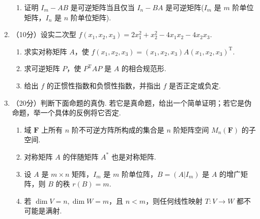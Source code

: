 \begin{enumerate}
\begin{enumerate}
        \item 证明 $I_m-AB$ 是可逆矩阵当且仅当 $I_n-BA$ 是可逆矩阵($I_m$ 是 $m$ 阶单位矩阵，$I_n$ 是 $n$ 阶单位矩阵).
    \end{enumerate}

    \item （10分）设实二次型 $f(x_1,x_2,x_3) = 2x_1^2+x_2^2-4x_1x_2-4x_2x_3$.
    \begin{enumerate}
        \item 求实对称矩阵 $A$，使 $f(x_1,x_2,x_3)=(x_1,x_2,x_3)A(x_1,x_2,x_3)^{\mathrm{T}}$.

        \item 求可逆矩阵 $P$，使 $P^\mathrm{T}AP$ 是 $A$ 的相合规范形.

        \item 给出 $f$ 的正惯性指数和负惯性指数，并指出 $f$ 是否正定或负定.
    \end{enumerate}

    \item （20分）判断下面命题的真伪. 若它是真命题，给出一个简单证明；若它是伪命题，举一个具体的反例将它否定.
    \begin{enumerate}
        \item 域 $\mathbf{F}$ 上所有 $n$ 阶不可逆方阵所构成的集合是 $n$ 阶矩阵空间 $M_n(\mathbf{F})$ 的子空间.

        \item 对称矩阵 $A$ 的伴随矩阵 $A^*$ 也是对称矩阵.

        \item 设 $A$ 是 $m\times n$ 矩阵，$I_m$ 是 $m$ 阶单位阵，$B=(A|I_m)$ 是 $A$ 的增广矩阵，则 $B$ 的秩 $r(B)=m$.

        \item 若 $\dim V = n,\dim W = m$，且 $n < m$，则任何线性映射 $T\colon V\to W$ 都不可能是满射.
    \end{enumerate}
\end{enumerate}

\clearpage

